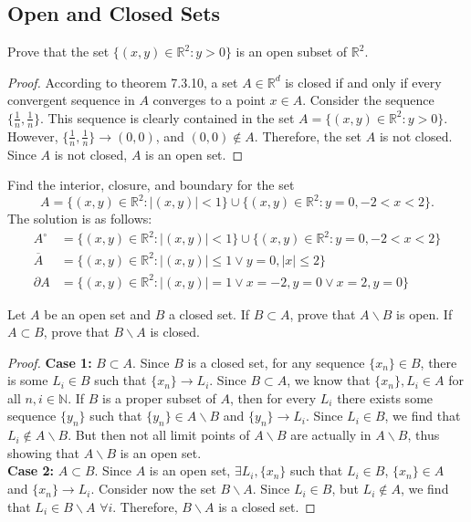 \documentclass[12pt]{book}
\newcommand{\N}{\mathbb{N}}
\newcommand{\R}{\mathbb{R}}
\newenvironment{exercise}[2][Exercise]{\begin{trivlist}
\item[\hskip \labelsep {\bfseries #1}\hskip \labelsep {\bfseries #2.}]}{\end{trivlist}}
\begin{document}
\begin{exercise}{7.2.7}
\section{Open and Closed Sets}


\begin{exercise}{7.3.1}
Prove that the set $\{(x, y) \in \R^2 : y > 0\}$ is an open subset of $\R^2$.

    \begin{proof}
    According to theorem 7.3.10, a set $A\in \R^d$ is closed if and only if every convergent sequence in $A$ converges to a point $x \in A$. Consider the sequence $\{\frac{1}{n}, \frac{1}{n} \}$. This sequence is clearly contained in the set $A = \{(x, y) \in \R^2 : y > 0\}$. However, $\{\frac{1}{n}, \frac{1}{n} \} \to (0,0)$, and $(0,0) \notin A$. Therefore, the set $A$ is not closed. Since $A$ is not closed, $A$ is an open set.
    \end{proof}
\end{exercise}


\begin{exercise}{7.3.4}
Find the interior, closure, and boundary for the set
\[ A= \{(x, y) \in \R^2 : |(x, y)| < 1\} \cup \{(x, y) \in \R^2 : y = 0, −2 < x < 2\}. \]
The solution is as follows:
    \begin{align*}
    A^\circ &= \{(x, y) \in \R^2 : |(x, y)| < 1\} \cup \{(x, y) \in \R^2 : y = 0, −2 < x < 2\}\\
    \overline{A} &= \{ (x,y) \in \R^2 : |(x,y)| \leq 1 \lor y=0, |x| \leq 2 \} \\
    \partial A &= \{ (x,y) \in \R^2: |(x,y)| = 1 \lor x=-2, y=0  \lor  x=2, y=0  \}
    \end{align*}
\end{exercise}


\begin{exercise}{7.3.6}
Let $A$ be an open set and $B$ a closed set. If $B \subset A$, prove that $A \backslash B$ is
open. If $A \subset B$, prove that $B \backslash A$ is closed.

\begin{proof}
    \textbf{Case 1:} $B\subset A$. Since $B$ is a closed set, for any sequence $\{x_n\} \in B$, there is some $L_i \in B$ such that $\{x_n\} \to L_i$. Since $B \subset A$, we know that $\{x_n\}, L_i \in A$ for all $n,i \in \N$. If $B$ is a proper subset of $A$, then for every $L_i$ there exists some sequence $\{y_n\}$ such that $\{y_n\} \in A\backslash B$ and $\{y_n\} \to L_i$. Since $L_i \in B$, we find that $L_i \notin A\backslash B$. But then not all limit points of $A \backslash B$ are actually in $A \backslash B$, thus showing that $A \backslash B$ is an open set. \\
    \textbf{Case 2:} $A \subset B$. Since $A$ is an open set, $\exists L_i, \{x_n\}$ such that $L_i \in B$, $\{x_n\} \in A$ and $\{x_n\} \to L_i$. Consider now the set $B \backslash A$. Since $L_i \in B$, but $L_i \notin A$, we find that $L_i \in B \backslash A  \, \, \forall i$. Therefore, $B \backslash A$ is a closed set.
\end{proof}
\end{exercise}



\end{exercise}
\end{document}
